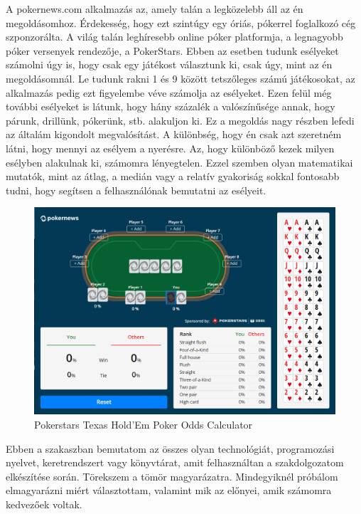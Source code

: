 A pokernews.com alkalmazás az, amely talán a legközelebb áll az én megoldásomhoz. Érdekesség, hogy ezt szintúgy egy óriás, pókerrel foglalkozó cég szponzorálta. A világ talán leghíresebb online póker platformja, a legnagyobb póker versenyek rendezője, a PokerStars. Ebben az esetben tudunk esélyeket számolni úgy is, hogy csak egy játékost választunk ki, csak úgy, mint az én megoldásomnál. Le tudunk rakni 1 és 9 között tetszőleges számú játékosokat, az alkalmazás pedig ezt figyelembe véve számolja az esélyeket. Ezen felül még további esélyeket is látunk, hogy hány százalék a valószínűsége annak, hogy párunk, drillünk, pókerünk, stb. alakuljon ki. Ez a megoldás nagy részben lefedi az általám kigondolt megvalósítást. A különbség, hogy én csak azt szeretném látni, hogy mennyi az esélyem a nyerésre. Az, hogy különböző kezek milyen esélyben alakulnak ki, számomra lényegtelen. Ezzel szemben olyan matematikai mutatók, mint az átlag, a medián vagy a relatív gyakoriság sokkal fontosabb tudni, hogy segítsen a felhasználónak bemutatni az esélyeit.
\begin{figure}[h!]
\centering
\includegraphics[scale=0.5]{images/pokerstars.png}
\caption{Pokerstars Texas Hold'Em Poker Odds Calculator}
\label{fig:pokerstars}
\end{figure}

\cite{cardschat}
\cite{pokerstars}
\cite{harrington}

Ebben a szakaszban bemutatom az összes olyan technológiát, programozási nyelvet, keretrendszert vagy könyvtárat, amit felhasználtan a szakdolgozatom elkészítése során. Törekszem a tömör magyarázatra. Mindegyiknél próbálom elmagyarázni miért választottam, valamint mik az előnyei, amik számomra kedvezőek voltak.


